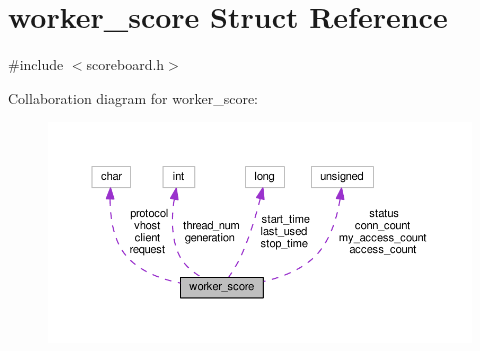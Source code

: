 \hypertarget{structworker__score}{}\section{worker\+\_\+score Struct Reference}
\label{structworker__score}


{\ttfamily \#include $<$scoreboard.\+h$>$}



Collaboration diagram for worker\+\_\+score\+:
\nopagebreak
\begin{figure}[H]
\begin{center}
\leavevmode
\includegraphics[width=350pt]{structworker__score__coll__graph}
\end{center}
\end{figure}
